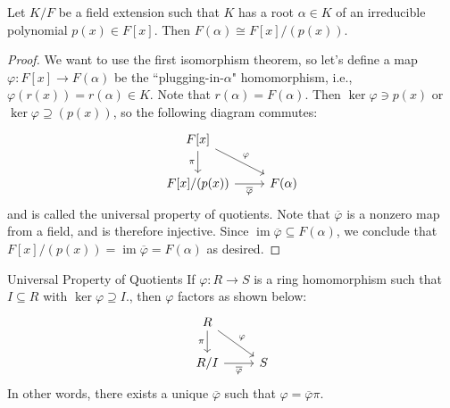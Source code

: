 \documentclass{article}
\theoremstyle{plain}
\newcommand{\on}[1]{\operatorname{#1}}
\begin{document}
\begin{theorem}{}{}
Let $K/F$ be a field extension such that $K$ has a root $\alpha \in K$ of an irreducible polynomial $p(x) \in F[x]$. Then $F(\alpha) \cong F[x]/(p(x))$.	
\end{theorem}
\begin{proof}
We want to use the first isomorphism theorem, so let's define a map $\varphi : F[x] \to F(\alpha)$ be the ``plugging-in-$\alpha$" homomorphism, i.e., $\varphi(r(x)) = r(\alpha) \in K$. Note that $r(\alpha) = F(\alpha)$. Then $\ker\varphi \ni p(x)$ or $\ker\varphi \supseteq (p(x))$, so the following diagram commutes:
	\[ \begin{tikzcd}
	F[x]\arrow[swap]{d}{\pi}\arrow{rd}{\varphi} & {} \\%
	F[x]/(p(x))\arrow[swap]{r}{\overline{\varphi}} & F(\alpha)
	\end{tikzcd}
	\]
and is called the universal property of quotients. Note that $\overline{\varphi}$ is a nonzero map from a field, and is therefore injective. Since $\on{im}\overline{\varphi} \subseteq F(\alpha)$, we conclude that $F[x]/(p(x)) = \on{im}\overline{\varphi} = F(\alpha)$ as desired.
\end{proof}
\begin{theorem}{Universal Property of Quotients}{}
	If $\varphi : R \to S$ is a ring homomorphism such that $I \subseteq R$ with $\ker\varphi \supseteq I$., then $\varphi$ factors as shown below:
	\[ \begin{tikzcd}
	R\arrow[swap]{d}{\pi}\arrow{rd}{\varphi} & {} \\%
	R/I\arrow[swap]{r}{\overline{\varphi}} & S
	\end{tikzcd}
	\]
	In other words, there exists a unique $\overline{\varphi}$ such that $\varphi = \overline{\varphi}\pi$.
\end{theorem}
\end{document}

